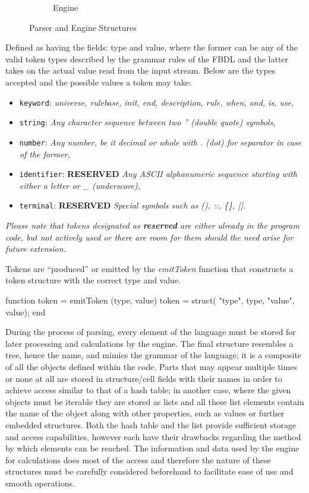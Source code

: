 \begin{figure}[!h]
\begin{subfigure}{.5\textwidth}
	\caption{Engine}
	\label{fig:engineUML}
\end{subfigure}
\caption{Parser and Engine Structures}
\label{fig:paserengine}
\end{figure}

Defined as having the fields: type and value, where the former can be any of the valid token types described by the grammar rules of the FBDL and the latter takes on the actual value read from the input stream. Below are the types accepted and the possible values a token may take:

\begin{itemize}
	\item \texttt{keyword}: \textit{universe, rulebase, init, end, description, rule, when, and, is, use},
	\item \texttt{string}: \textit{Any character sequence between two '' (double quote) symbols},
	\item \texttt{number}: \textit{Any number, be it decimal or whole with . (dot) for separator in case of the former},
	\item \texttt{identifier}: \textbf{RESERVED} \textit{Any ASCII alphanumeric sequence starting with either a letter or \_ (underscore)},
	\item \texttt{terminal}: \textbf{RESERVED} \textit{Special symbols such as (), ::, \{\}, []}.
\end{itemize}

\textit{Please note that tokens designated as \textbf{reserved} are either already in the program code, but not actively used or there are room for them should the need arise for future extension.}

Tokens are ``produced'' or emitted by the \textit{emitToken}  function that constructs a token structure with the correct type and value.

\begin{octave}
function token = emitToken (type, value)
  token = struct(
    "type", type,
    "value", value);
end
\end{octave}

During the process of parsing, every element of the language must be stored for later processing and calculations by the engine. The final structure resembles a tree, hence the name, and mimics the grammar of the language; it is a composite of all the objects defined within the code. Parts that may appear multiple times or none at all are stored in structure/cell fields with their names in order to achieve access similar to that of a hash table; in another case, where the given objects must be iterable they are stored as lists and all these list elements contain the name of the object along with other properties, such as values or further embedded structures. Both the hash table and the list provide sufficient storage and access capabilities, however each have their drawbacks regarding the method by which elements can be reached. The information and data used by the engine for calculations does most of the access and therefore the nature of these structures must be carefully considered beforehand to facilitate ease of use and smooth operations.


